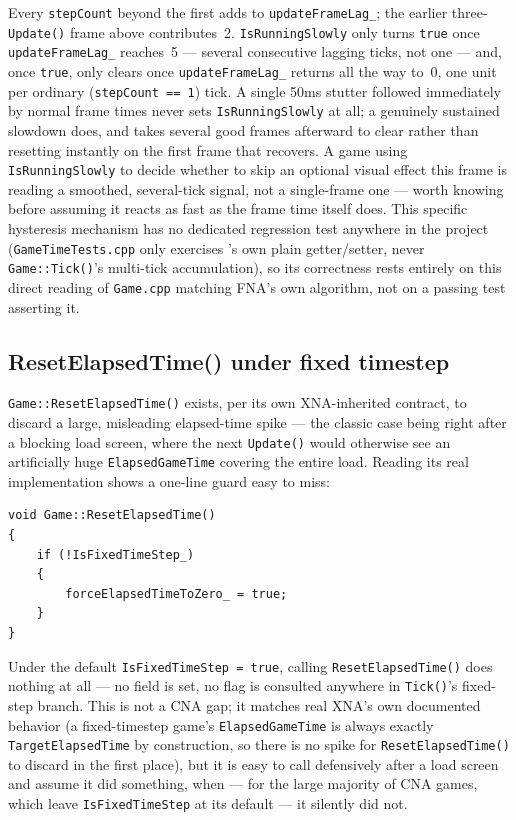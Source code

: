 Every \texttt{stepCount} beyond the first adds to \texttt{updateFrameLag\_}; the earlier
three-\texttt{Update()} frame above contributes~2. \texttt{IsRunningSlowly} only turns
\texttt{true} once \texttt{updateFrameLag\_} reaches~5 --- several consecutive lagging ticks, not
one --- and, once \texttt{true}, only clears once \texttt{updateFrameLag\_} returns all the way
to~0, one unit per ordinary (\texttt{stepCount == 1}) tick. A single 50ms stutter followed
immediately by normal frame times never sets \texttt{IsRunningSlowly} at all; a genuinely
sustained slowdown does, and takes several good frames afterward to clear rather than resetting
instantly on the first frame that recovers. A game using \texttt{IsRunningSlowly} to decide
whether to skip an optional visual effect this frame is reading a smoothed, several-tick signal,
not a single-frame one --- worth knowing before assuming it reacts as fast as the frame time
itself does. This specific hysteresis mechanism has no dedicated regression test anywhere in the
project (\texttt{GameTimeTests.cpp} only exercises 's own plain
getter/setter, never \texttt{Game::Tick()}'s multi-tick accumulation), so its correctness rests
entirely on this direct reading of \texttt{Game.cpp} matching FNA's own algorithm, not on a
passing test asserting it.

\subsection{ResetElapsedTime() under fixed timestep}

\texttt{Game::ResetElapsedTime()} exists, per its own XNA-inherited contract, to discard a
large, misleading elapsed-time spike --- the classic case being right after a blocking load
screen, where the next \texttt{Update()} would otherwise see an artificially huge
\texttt{ElapsedGameTime} covering the entire load. Reading its real implementation shows a
one-line guard easy to miss:

\begin{lstlisting}
void Game::ResetElapsedTime()
{
    if (!IsFixedTimeStep_)
    {
        forceElapsedTimeToZero_ = true;
    }
}
\end{lstlisting}

Under the default \texttt{IsFixedTimeStep = true}, calling \texttt{ResetElapsedTime()} does
nothing at all --- no field is set, no flag is consulted anywhere in \texttt{Tick()}'s
fixed-step branch. This is not a CNA gap; it matches real XNA's own documented behavior (a
fixed-timestep game's \texttt{ElapsedGameTime} is always exactly \texttt{TargetElapsedTime} by
construction, so there is no spike for \texttt{ResetElapsedTime()} to discard in the first
place), but it is easy to call defensively after a load screen and assume it did something,
when --- for the large majority of CNA games, which leave \texttt{IsFixedTimeStep} at its
default --- it silently did not.

